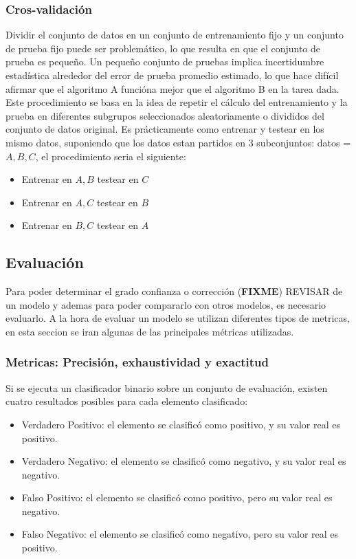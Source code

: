 \documentclass[a4paper,11pt,spanish]{book}
\newcommand*{\FIXME}[1]{{(\textbf{FIXME}) {#1}}}
\begin{document}
	\subsubsection {Cros-validación}
	  Dividir el conjunto de datos en un conjunto de entrenamiento fijo y un conjunto de prueba fijo puede ser problemático, lo que resulta en que el conjunto de prueba es pequeño. 
	  Un pequeño conjunto de pruebas implica incertidumbre estadística alrededor del error de prueba promedio estimado, lo que hace difícil afirmar que el algoritmo A funcióna mejor que el algoritmo B en la tarea dada.
	  Este procedimiento se basa en la idea de repetir el cálculo del entrenamiento y la prueba en diferentes subgrupos seleccionados aleatoriamente o divididos del conjunto de datos original.
	  Es prácticamente como entrenar y testear en los mismo datos, suponiendo que los datos estan partidos en 3 subconjuntos: datos = ${A,B,C}$, el procedimiento seria el siguiente:
	  \begin{itemize}
	    \item Entrenar en ${A,B}$ testear en ${C}$
	    \item Entrenar en ${A,C}$ testear en ${B}$
	    \item Entrenar en ${B,C}$ testear en ${A}$
	  \end{itemize}

      \subsection{Evaluación}
	Para poder determinar el grado confianza o corrección \FIXME{REVISAR} de un modelo y ademas para poder compararlo con otros modelos, es necesario evaluarlo. 
	A la hora de evaluar un modelo se utilizan diferentes tipos de metricas, en esta seccion se iran algunas de las principales métricas utilizadas.    

	\subsubsection {Metricas: Precisión, exhaustividad y exactitud}
	  Si se ejecuta un clasificador binario sobre un conjunto de evaluación, existen cuatro resultados posibles para cada elemento clasificado:
	  \begin{itemize}	
	    \item Verdadero Positivo: el elemento se clasificó como positivo, y su valor real es positivo.
	    \item Verdadero Negativo: el elemento se clasificó como negativo, y su valor real es negativo.
	    \item Falso Positivo: el elemento se clasificó como positivo, pero su valor real es negativo.
	    \item Falso Negativo: el elemento se clasificó como negativo, pero su valor real es positivo.
	  \end{itemize}
	  
\end{document}
